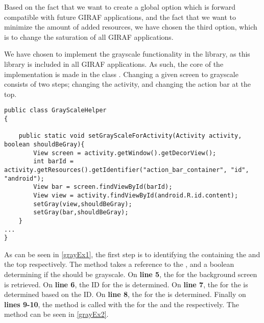 Based on the fact that we want to create a global option which is forward
compatible with future GIRAF applications, and the fact that we want
to minimize the amount of added resources, we have chosen the third
option, which is to change the saturation of all GIRAF applications.\nl

We have chosen to implement the grayscale functionality in the
 library, as this library is included in all GIRAF
applications. As such, the core of the implementation is made in the class
. Changing a given screen to grayscale consists of two
steps; changing the activity, and changing the action bar at the top.\nl

\begin{minipage}[H]{\linewidth}
\begin{lstlisting}[caption = Code used to determine the views for the activity and the top action bar., label = grayEx1] 
public class GrayScaleHelper
{

    public static void setGrayScaleForActivity(Activity activity, boolean shouldBeGray){
        View screen = activity.getWindow().getDecorView();
        int barId = activity.getResources().getIdentifier("action_bar_container", "id", "android");
        View bar = screen.findViewById(barId);
        View view = activity.findViewById(android.R.id.content);
        setGray(view,shouldBeGray);
        setGray(bar,shouldBeGray);
    }
...
}
\end{lstlisting}
\end{minipage}

As can be seen in \autoref{grayEx1}, the first step is to identifying the
 containing the  and the top 
respectively. The method  takes a reference to
the , and a boolean determining if the 
should be grayscale. On \textbf{line 5}, the  for the background
 screen is retrieved. On \textbf{line 6}, the ID for the
 is determined. On \textbf{line 7}, the  for the
 is determined based on the ID. On \textbf{line 8}, the
 for the  is determined. Finally on \textbf{lines 9-10}, the 
method is called with the  for the  and the
 respectively. The  method can be seen in
\autoref{grayEx2}.\nl

